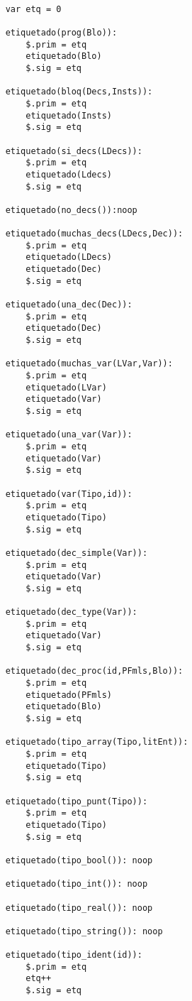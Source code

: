 \begin{lstlisting}

    var etq = 0 

    etiquetado(prog(Blo)):
        $.prim = etq
        etiquetado(Blo)
        $.sig = etq

    etiquetado(bloq(Decs,Insts)):
        $.prim = etq
        etiquetado(Insts)
        $.sig = etq
    
    etiquetado(si_decs(LDecs)):
        $.prim = etq
        etiquetado(Ldecs)
        $.sig = etq
    
    etiquetado(no_decs()):noop
    
    etiquetado(muchas_decs(LDecs,Dec)):
        $.prim = etq
        etiquetado(LDecs)
        etiquetado(Dec)
        $.sig = etq
    
    etiquetado(una_dec(Dec)):
        $.prim = etq
        etiquetado(Dec)
        $.sig = etq

    etiquetado(muchas_var(LVar,Var)):
        $.prim = etq
        etiquetado(LVar)
        etiquetado(Var)
        $.sig = etq

    etiquetado(una_var(Var)):
        $.prim = etq
        etiquetado(Var)
        $.sig = etq
    
    etiquetado(var(Tipo,id)):
        $.prim = etq
        etiquetado(Tipo)
        $.sig = etq
    
    etiquetado(dec_simple(Var)):
        $.prim = etq
        etiquetado(Var)
        $.sig = etq

    etiquetado(dec_type(Var)):
        $.prim = etq
        etiquetado(Var)
        $.sig = etq
    
    etiquetado(dec_proc(id,PFmls,Blo)):
        $.prim = etq
        etiquetado(PFmls)
        etiquetado(Blo)
        $.sig = etq

    etiquetado(tipo_array(Tipo,litEnt)):
        $.prim = etq
        etiquetado(Tipo)
        $.sig = etq

    etiquetado(tipo_punt(Tipo)):
        $.prim = etq
        etiquetado(Tipo)
        $.sig = etq

    etiquetado(tipo_bool()): noop

    etiquetado(tipo_int()): noop

    etiquetado(tipo_real()): noop

    etiquetado(tipo_string()): noop

    etiquetado(tipo_ident(id)):
        $.prim = etq
        etq++
        $.sig = etq


\end{lstlisting}
